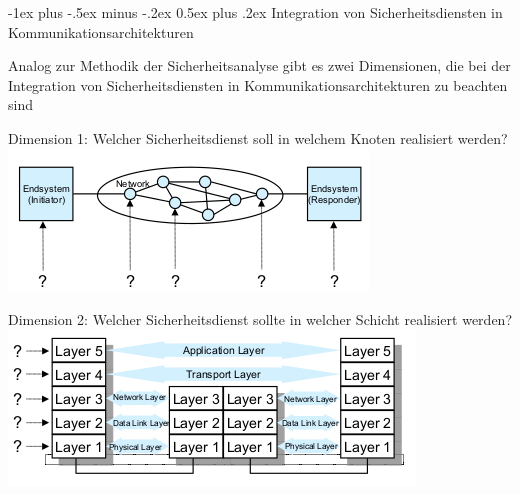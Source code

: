 \documentclass[a4paper]{article}
\makeatletter
\renewcommand{\section}{\@startsection{section}{1}{0mm}%
 {-1ex plus -.5ex minus -.2ex}%
 {0.5ex plus .2ex}%
 {\normalfont\large\bfseries}}
\makeatother
\begin{document}
\begin{multicols}{3}
      \section{Integration von Sicherheitsdiensten in Kommunikationsarchitekturen}
      \begin{itemize*}
            \item Analog zur Methodik der Sicherheitsanalyse gibt es zwei Dimensionen, die bei der Integration von Sicherheitsdiensten in Kommunikationsarchitekturen zu beachten sind
            \item Dimension 1: Welcher Sicherheitsdienst soll in welchem Knoten realisiert werden?
            \includegraphics[width=.6\linewidth]{Assets/NetworkSecurity-Security-service-dim-1.png}
            \item Dimension 2: Welcher Sicherheitsdienst sollte in welcher Schicht realisiert werden?
            \includegraphics[width=.6\linewidth]{Assets/NetworkSecurity-Security-service-dim-2.png}
      \end{itemize*}


\end{multicols}
\end{document}
